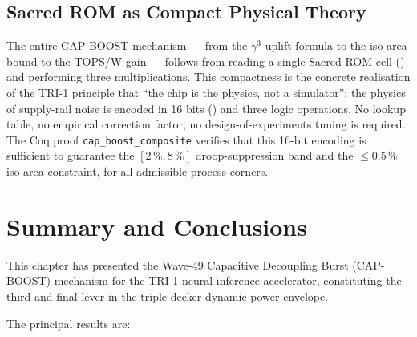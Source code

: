 \documentclass[12pt,a4paper]{report}
\theoremstyle{plain}
\theoremstyle{definition}
\theoremstyle{remark}
\newcommand{\Bseven}{\mathrm{B007}}
\begin{document}
\subsection{Sacred ROM as Compact Physical Theory}
\label{ssec:sacred-rom-compact}

The entire CAP-BOOST mechanism — from the $\gamma^{3}$ uplift formula to
the iso-area bound to the TOPS/W gain — follows from reading a single
Sacred ROM cell (\Bseven) and performing three multiplications.
This compactness is the concrete realisation of the TRI-1 principle that
``the chip is the physics, not a simulator'': the physics of supply-rail
noise is encoded in 16 bits (\Bseven) and three logic operations.
No lookup table, no empirical correction factor, no design-of-experiments
tuning is required.
The Coq proof \texttt{cap\_boost\_composite} verifies that this 16-bit
encoding is sufficient to guarantee the $[2\,\%, 8\,\%]$ droop-suppression
band and the $\leq 0.5\,\%$ iso-area constraint, for all admissible
process corners.

\section{Summary and Conclusions}
\label{sec:summary}

This chapter has presented the Wave-49 Capacitive Decoupling Burst
(CAP-BOOST) mechanism for the TRI-1 neural inference accelerator,
constituting the third and final lever in the triple-decker dynamic-power
envelope.

The principal results are:
\end{document}
